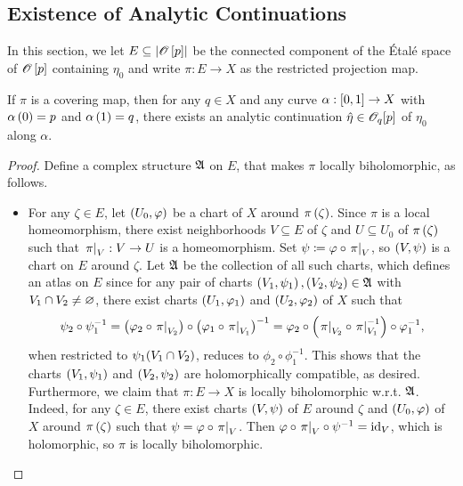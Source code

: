 \documentclass[../Moduli_Spaces_of_Riemann_Surfaces.tex]{subfiles}
\begin{document}
    \subsection{Existence of Analytic Continuations}
    In this section, we let $E\subseteq\l|\HOLO\l[p\r]\r|$ be the connected component of the Étalé space of $\HOLO\l[p\r]$ containing $\eta_0$ and write $\pi:E\to X$ as the restricted projection map.
    \begin{theorem}\label{CS:thm:existence_of_analytic_continuation}
        If $\pi$ is a covering map, then for any $q\in X$ and any curve $\alpha:\l[0,1\r]\to X$ with $\alpha\l(0\r)=p$ and $\alpha\l(1\r)=q$, there exists an analytic continuation $\hat{\eta}\in\HOLO_q\!\l[p\r]$ of $\eta_0$ along $\alpha$.
    \end{theorem}
    \begin{proof}
        Define a complex structure $\mf{A}$ on $E$, that makes $\pi$ locally biholomorphic, as follows.
        \begin{itemize}
            \item For any $\zeta\in E$, let $\tpl{U_0,\phi}$ be a chart of $X$ around $\pi\l(\zeta\r)$. Since $\pi$ is a local homeomorphism, there exist neighborhoods $V\subseteq E$ of $\zeta$ and $U\subseteq U_0$ of $\pi\l(\zeta\r)$ such that $\l.\pi\r|_V:V\to U$ is a homeomorphism. Set $\psi\coloneqq\phi\circ\l.\pi\r|_V$, so $\tpl{V,\psi}$ is a chart on $E$ around $\zeta$. Let $\mf{A}$ be the collection of all such charts, which defines an atlas on $E$ since for any pair of charts $\tpl{V_1,\psi_1},\tpl{V_2,\psi_2}\in\mf{A}$ with $V_1\cap V_2\neq\em$, there exist charts $\tpl{U_1,\phi_1}$ and $\tpl{U_2,\phi_2}$ of $X$ such that
                \begin{equation*}
                    \psi_2\circ\psi_1^{-1}=\l(\phi_2\circ\l.\pi\r|_{V_2}\r)\circ\l(\phi_1\circ\l.\pi\r|_{V_1}\r)^{-1}=\phi_2\circ\l(\l.\pi\r|_{V_2}\circ\l.\pi\r|_{V_1}^{-1}\r)\circ\phi_1^{-1},
                \end{equation*}
                when restricted to $\psi_1\!\l(V_1\cap V_2\r)$, reduces to $\phi_2\circ\phi_1^{-1}$. This shows that the charts $\tpl{V_1,\psi_1}$ and $\tpl{V_2,\psi_2}$ are holomorphically compatible, as desired. Furthermore, we claim that $\pi:E\to X$ is locally biholomorphic w.r.t. $\mf{A}$. Indeed, for any $\zeta\in E$, there exist charts $\tpl{V,\psi}$ of $E$ around $\zeta$ and $\tpl{U_0,\phi}$ of $X$ around $\pi\l(\zeta\r)$ such that $\psi=\phi\circ\l.\pi\r|_V$. Then $\phi\circ\l.\pi\r|_V\circ\psi^{-1}=\id_V$, which is holomorphic, so $\pi$ is locally biholomorphic.

\end{itemize}
\end{proof}
\end{document}

